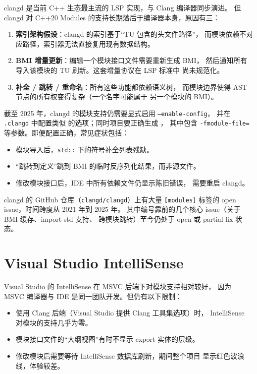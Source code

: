 \documentclass[12pt,a4paper,fontset=fandol]{ctexbook}
\newcommand{\flag}[1]{\texttt{#1}}
\begin{document}
clangd 是当前 C++ 生态最主流的 LSP 实现，与 Clang 编译器同步演进。
但 clangd 对 C++20 Modules 的支持长期落后于编译器本身，原因有三：

\begin{enumerate}
  \item \textbf{索引架构假设}：clangd 的索引基于“TU 包含的头文件路径”，
        而模块依赖不对应路径，索引器无法直接复用现有数据结构。
  \item \textbf{BMI 增量更新}：编辑一个模块接口文件需要重新生成 BMI，
        然后通知所有导入该模块的 TU 刷新。这套增量协议在 LSP 标准中
        尚未规范化。
  \item \textbf{补全 / 跳转 / 重命名}：所有这些功能都依赖语义树，
        而模块边界使得 AST 节点的所有权变得复杂（一个名字可能属于
        另一个模块的 BMI）。
\end{enumerate}

截至 2025 年，clangd 的模块支持仍需要显式启用 \flag{--enable-config}，
并在 \texttt{.clangd} 中配置类似
的选项；同时项目要正确生成
，
其中包含 \flag{-fmodule-file=} 等参数。即便配置正确，常见症状包括：

\begin{itemize}
  \item 模块导入后，\flag{std::} 下的符号补全列表残缺。
  \item “跳转到定义”跳到 BMI 的临时反序列化结果，而非源文件。
  \item 修改模块接口后，IDE 中所有依赖文件仍显示陈旧错误，
        需要重启 clangd。
\end{itemize}

\begin{evidence}[title=clangd 模块支持证据]
clangd 的 GitHub 仓库（\texttt{clangd/clangd}）上有大量
\texttt{[modules]} 标签的 open issue，时间跨度从 2021 年到 2025 年。
其中编号靠前的几个核心 issue（关于 BMI 缓存、import std 支持、
跨模块跳转）至今仍处于 open 或 partial fix 状态。
\end{evidence}

\section{Visual Studio IntelliSense}

Visual Studio 的 IntelliSense 在 MSVC 后端下对模块支持相对较好，
因为 MSVC 编译器与 IDE 是同一团队开发。但仍有以下限制：

\begin{itemize}
  \item 使用 Clang 后端（Visual Studio 提供 Clang 工具集选项）时，
        IntelliSense 对模块的支持几乎为零。
  \item 模块接口文件的“大纲视图”有时不显示 export 实体的层级。
  \item 修改模块后需要等待 IntelliSense 数据库刷新，期间整个项目
        显示红色波浪线，体验较差。
\end{itemize}
\end{document}
